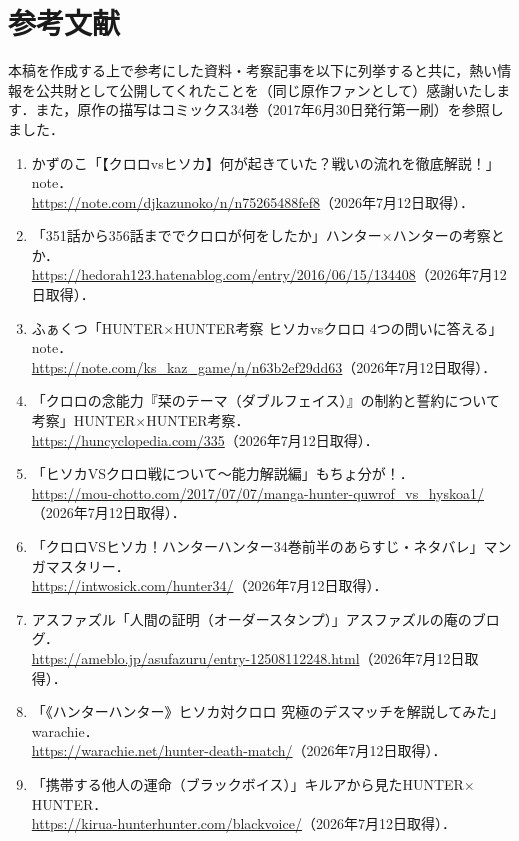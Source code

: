 \documentclass[a4paper,12pt]{jarticle}
\theoremstyle{definition}
\theoremstyle{plain}
\theoremstyle{definition}
\theoremstyle{remark}
\begin{document}
\section*{参考文献}
{\small

本稿を作成する上で参考にした資料・考察記事を以下に列挙すると共に，熱い情報を公共財として公開してくれたことを（同じ原作ファンとして）感謝いたします．また，原作の描写はコミックス34巻（2017年6月30日発行第一刷）を参照しました．



\begin{enumerate}
\item\label{ref:kazunoko} かずのこ「【クロロvsヒソカ】何が起きていた？戦いの流れを徹底解説！」note．\\
  \url{https://note.com/djkazunoko/n/n75265488fef8}（2026年7月12日取得）．
\item\label{ref:hedorah} 「351話から356話まででクロロが何をしたか」ハンター$\times$ハンターの考察とか．\\
  \url{https://hedorah123.hatenablog.com/entry/2016/06/15/134408}（2026年7月12日取得）．
\item\label{ref:fakutsu} ふぁくつ「HUNTER$\times$HUNTER考察 ヒソカvsクロロ 4つの問いに答える」note．\\
  \url{https://note.com/ks_kaz_game/n/n63b2ef29dd63}（2026年7月12日取得）．

\item\label{ref:huncyclo} 「クロロの念能力『栞のテーマ（ダブルフェイス）』の制約と誓約について考察」HUNTER$\times$HUNTER考察．\\
  \url{https://huncyclopedia.com/335}（2026年7月12日取得）．
\item\label{ref:mocho} 「ヒソカVSクロロ戦について～能力解説編」もちょ分が！．\\
  \url{https://mou-chotto.com/2017/07/07/manga-hunter-quwrof_vs_hyskoa1/}（2026年7月12日取得）．
\item\label{ref:intwosick} 「クロロVSヒソカ！ハンターハンター34巻前半のあらすじ・ネタバレ」マンガマスタリー．\\
  \url{https://intwosick.com/hunter34/}（2026年7月12日取得）．
\item\label{ref:asufazuru} アスファズル「人間の証明（オーダースタンプ）」アスファズルの庵のブログ．\\
  \url{https://ameblo.jp/asufazuru/entry-12508112248.html}（2026年7月12日取得）．
\item\label{ref:warachie} 「《ハンターハンター》ヒソカ対クロロ 究極のデスマッチを解説してみた」warachie．\\
  \url{https://warachie.net/hunter-death-match/}（2026年7月12日取得）．
\item\label{ref:kirua} 「携帯する他人の運命（ブラックボイス）」キルアから見たHUNTER$\times$HUNTER．\\
  \url{https://kirua-hunterhunter.com/blackvoice/}（2026年7月12日取得）．
\end{enumerate}
}
\end{document}
